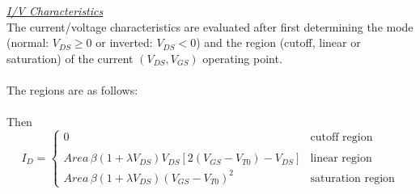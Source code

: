 \noindent\underline{\sl\large I/V Characteristics}\\[0.1in]
The current/voltage characteristics are evaluated after first
determining the mode (normal: $V_{DS} \ge 0$ or inverted:
$V_{DS} < 0$) and the region (cutoff,
linear or saturation) of the current
$(V_{DS}, V_{GS})$ operating point.\\[0.1in]

\\[0.2in]
The regions are as follows:\\[0.1in]
\hspace*{\fill}\\[0.1in]
Then
\begin{equation}
I_{D} = \left\{ \begin{array}{ll}
      0  & \mbox{cutoff region} \\ \\
      Area\,\beta \left(1 + \lambda V_{DS}\right)V_{DS}
      \left[2\left(V_{GS}-V_{T0}\right)-V_{DS}\right]
         &\mbox{linear region}\\
      Area\,\beta \left(1 + \lambda V_{DS}\right)
      \left(V_{GS}-V_{T0}\right)^2
         &\mbox{saturation region} \end{array} \right. %
      \label{jid}
\end{equation}

